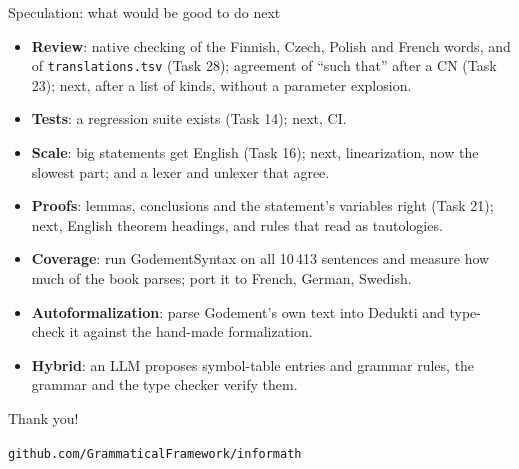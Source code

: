\documentclass[10pt,aspectratio=169]{beamer}
\newcommand{\ok}[1]{\textcolor{good}{#1}}
\begin{document}
\begin{frame}{Speculation: what would be good to do next}
  \begin{itemize}\small
    \item \textbf{Review}: native checking of the Finnish, Czech, Polish and French
          words, and of \texttt{translations.tsv} (Task 28); agreement of ``such that'' \ok{after a CN (Task 23)}; next, after a
          list of kinds, without a parameter explosion.
    \item \textbf{Tests}: \ok{a regression suite exists (Task 14)}; next, CI.
    \item \textbf{Scale}: \ok{big statements get English (Task 16)}; next,
          linearization, now the slowest part; and a lexer and unlexer that agree.
    \item \textbf{Proofs}: \ok{lemmas, conclusions and the statement's variables right
          (Task 21)}; next, English theorem headings, and rules that read as tautologies.
    \item \textbf{Coverage}: run GodementSyntax on all 10\,413 sentences and measure
          how much of the book parses; port it to French, German, Swedish.
    \item \textbf{Autoformalization}: parse Godement's own text into Dedukti and
          type-check it against the hand-made formalization.
    \item \textbf{Hybrid}: an LLM proposes symbol-table entries and grammar rules,
          the grammar and the type checker verify them.
  \end{itemize}
\end{frame}

\begin{frame}[standout]
  Thank you!

  \vspace{1em}
  \normalsize
  \texttt{github.com/GrammaticalFramework/informath}
\end{frame}
\end{document}
